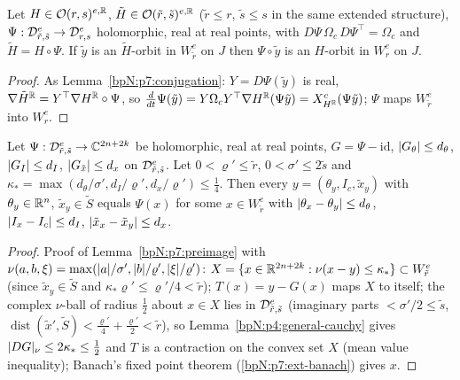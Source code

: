 \begin{lemma}[Conjugation]\label{bpN:p11:conj}
Let $H\in\mathcal O(r,s)^{e,\mathbb{R}}$, $\tilde H\in\mathcal O(\tilde r,\tilde s)^{e,\mathbb{R}}$ ($\tilde r\le r$, $\tilde s\le s$ in the same extended structure), $\Psi:\mathcal D_{\tilde r,\tilde s}^e\to\mathcal D_{r,s}^e$ holomorphic, real at real points, with $D\Psi\,\Omega_c\,D\Psi^\top=\Omega_c$ and $\tilde H=H\circ\Psi$. If $\tilde y$ is an $\tilde H$-orbit in $W^e_{\tilde r}$ on $J$ then $\Psi\circ\tilde y$ is an $H$-orbit in $W^e_r$ on $J$.
\end{lemma}
\begin{proof}
\label{stepN:p11:cj} As Lemma~\ref{bpN:p7:conjugation}: $Y=D\Psi(\tilde y)$ is real, $\nabla\tilde H^{\mathbb{R}}=Y^\top\nabla H^{\mathbb{R}}\circ\Psi$, so $\frac d{dt}\Psi(\tilde y)=Y\Omega_cY^\top\nabla H^{\mathbb{R}}(\Psi\tilde y)=X^c_{H^{\mathbb{R}}}(\Psi\tilde y)$; $\Psi$ maps $W^e_{\tilde r}$ into $W^e_r$.
\end{proof}

\begin{lemma}\label{bpN:p11:preimage}
Let $\Psi:\mathcal D_{\tilde r,\tilde s}^e\to\mathbb{C}^{2n+2k}$ be holomorphic, real at real points, $G=\Psi-\mathrm{id}$, $\lvert G_\theta\rvert\le d_\theta$, $\lvert G_I\rvert\le d_I$, $\lvert G_{\tilde x}\rvert\le d_x$ on $\mathcal D_{\tilde r,\tilde s}^e$. Let $0<\varrho'\le\tilde r$, $0<\sigma'\le2\tilde s$ and $\kappa_*=\max(d_\theta/\sigma',d_I/\varrho',d_x/\varrho')\le\frac14$. Then every $y=(\theta_y,I_c,\tilde x_y)$ with $\theta_y\in\mathbb{R}^n$, $\tilde x_y\in\tilde S$ equals $\Psi(x)$ for some $x\in W^e_{\tilde r}$ with $\lvert \theta_x-\theta_y\rvert\le d_\theta$, $\lvert I_x-I_c\rvert\le d_I$, $\lvert \tilde x_x-\tilde x_y\rvert\le d_x$.
\end{lemma}
\begin{proof}
Proof of Lemma~\ref{bpN:p7:preimage} with $\nu(a,b,\xi)=\max(\lvert a\rvert/\sigma',\lvert b\rvert/\varrho',\lvert \xi\rvert/\varrho')$: $X=\{x\in\mathbb{R}^{2n+2k}:\nu(x-y)\le\kappa_*\}\subset W^e_{\tilde r}$ (since $\tilde x_y\in\tilde S$ and $\kappa_*\varrho'\le\varrho'/4<\tilde r$); $T(x)=y-G(x)$ maps $X$ to itself; the complex $\nu$-ball of radius $\frac12$ about $x\in X$ lies in $\mathcal D_{\tilde r,\tilde s}^e$ (imaginary parts $<\sigma'/2\le\tilde s$, $\operatorname{dist}(\tilde x',\tilde S)<\frac{\varrho'}4+\frac{\varrho'}2<\tilde r$), so Lemma~\ref{bpN:p4:general-cauchy} gives $\lvert DG\rvert_\nu\le2\kappa_*\le\frac12$ and $T$ is a contraction on the convex set $X$ (mean value inequality); Banach's fixed point theorem (\ref{bpN:p7:ext-banach}) gives $x$.
\end{proof}


